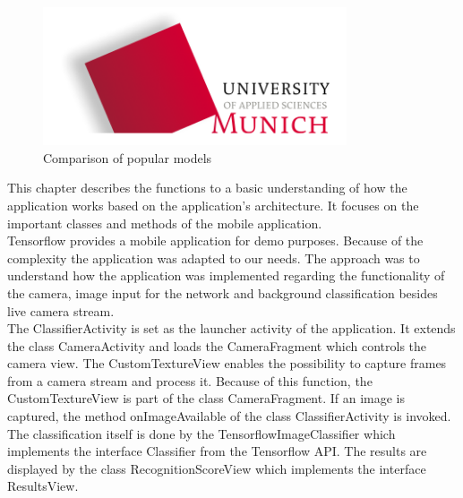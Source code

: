 \begin{figure}[htbp]
\includegraphics[width=0.8\textwidth]{includes/MUASlogo}
\caption[Comparison of popular models]{Comparison of popular models \citep{TensorFlowMobileNet}}
\label{fig:FH-Logo8}
\end{figure} 

This chapter describes the functions to a basic understanding of how the application works based on the application's architecture. It focuses on the important classes and methods of the mobile application. \\
Tensorflow provides a mobile application for demo purposes. Because of the complexity the application was adapted to our needs. The approach was to understand how the application was implemented regarding the functionality of the camera, image input for the network and background classification besides live camera stream. \\

The ClassifierActivity is set as the launcher activity of the application. It extends the class CameraActivity and loads the CameraFragment which controls the camera view. The CustomTextureView enables the possibility to capture frames from a camera stream and process it. Because of this function, the CustomTextureView is part of the class CameraFragment. If an image is captured, the method onImageAvailable of the class ClassifierActivity is invoked. The classification itself is done by the TensorflowImageClassifier which implements the interface Classifier from the Tensorflow API. The results are displayed by the class RecognitionScoreView which implements the interface ResultsView.